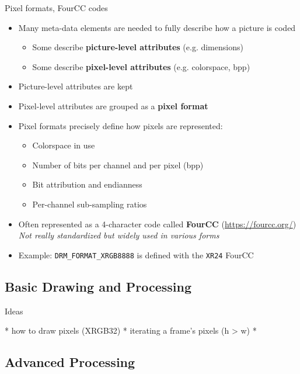 \begin{frame}[fragile]{Pixel formats, FourCC codes}

  \begin{itemize}
  \item Many meta-data elements are needed to fully describe how a picture is coded
    \begin{itemize}
    \item Some describe \textbf{picture-level attributes} (e.g. dimensions)
    \item Some describe \textbf{pixel-level attributes} (e.g. colorspace, bpp)
    \end{itemize}
  \item Picture-level attributes are kept
  \item Pixel-level attributes are grouped as a \textbf{pixel format}
  \item Pixel formats precisely define how pixels are represented:
    \begin{itemize}
    \item Colorspace in use
    \item Number of bits per channel and per pixel (bpp)
    \item Bit attribution and endianness
    \item Per-channel sub-sampling ratios
    \end{itemize}
  \item Often represented as a 4-character code called \textbf{FourCC} {\small(\url{https://fourcc.org/})}\\
  \textit{Not really standardized but widely used in various forms}
  \item Example: \verb,DRM_FORMAT_XRGB8888, is defined with the \verb,XR24, FourCC
  \end{itemize}

\end{frame}

\subsection{Basic Drawing and Processing}

\begin{frame}{Ideas}

* how to draw pixels (XRGB32)
* iterating a frame's pixels (h > w)
* 

\end{frame}

\subsection{Advanced Processing}

